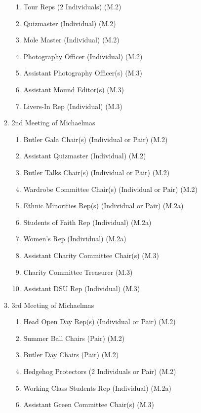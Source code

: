 \begin{enumerate}
\begin{enumerate}
\begin{enumerate}
            \item Tour Reps (2 Individuals) (M.2)
            \item Quizmaster (Individual) (M.2)
            \item Mole Master (Individual) (M.2)
            \item Photography Officer (Individual) (M.2)
            \item Assistant Photography Officer(s) (M.3)
            \item Assistant Mound Editor(s) (M.3)
            \item Livers-In Rep (Individual) (M.3)
        \end{enumerate}
        \item 2nd Meeting of Michaelmas
        \begin{enumerate}
            \item Butler Gala Chair(s) (Individual or Pair) (M.2)
            \item Assistant Quizmaster (Individual) (M.2)
            \item Butler Talks Chair(s) (Individual or Pair) (M.2)
            \item Wardrobe Committee Chair(s) (Individual or Pair) (M.2)
            \item Ethnic Minorities Rep(s) (Individual or Pair) (M.2a)
            \item Students of Faith Rep (Individual) (M.2a)
            \item Women's Rep (Individual) (M.2a)
            \item Assistant Charity Committee Chair(s) (M.3)
            \item Charity Committee Treasurer (M.3)
            \item Assistant DSU Rep (Individual) (M.3)
        \end{enumerate}
        \item 3rd Meeting of Michaelmas
        \begin{enumerate}
            \item Head Open Day Rep(s) (Individual or Pair) (M.2)
            \item Summer Ball Chairs (Pair) (M.2)
            \item Butler Day Chairs (Pair) (M.2)
            \item Hedgehog Protectors (2 Individuals or Pair) (M.2)
            \item Working Class Students Rep (Individual) (M.2a)
            \item Assistant Green Committee Chair(s) (M.3)

\end{enumerate}
\end{enumerate}
\end{enumerate}
